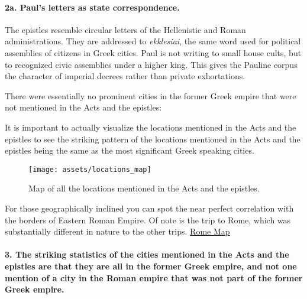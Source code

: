 \paragraph{2a.
Paul’s letters as state correspondence.}\label{par:pauls-letters-as-state-correspondence.}

The epistles resemble circular letters of the Hellenistic and Roman administrations.
They are addressed to \textit{ekklesiai}, the same word used for political assemblies of citizens in Greek cities.
Paul is not writing to small house cults, but to recognized civic assemblies under a higher king.
This gives the Pauline corpus the character of imperial decrees rather than private exhortations.

There were essentially no prominent cities in the former Greek empire that were not mentioned in the Acts and the epistles:


It is important to actually visualize the locations mentioned in the Acts and the epistles to see the striking pattern of the locations mentioned in the Acts and the epistles being the same as the most significant Greek speaking cities.

\begin{figure}[ht]
    \centering
    \texttt{[image: assets/locations\_map]}
    \caption{Map of all the locations mentioned in the Acts and the epistles.}
    \label{fig:figure}
\end{figure}

For those geographically inclined you can spot the near perfect correlation with the borders of Eastern Roman Empire.
Of note is the trip to Rome, which was substantially different in nature to the other trips.
\href{https://en.wikipedia.org/wiki/Byzantine_Empire_under_the_Theodosian_dynasty\#/media/File:4KTHEODOSIAN.png}{Rome Map}

\paragraph{3.
The striking statistics of the cities mentioned in the Acts and the epistles are that they are all in the former Greek empire, and not one mention of a city in the Roman empire that was not part of the former Greek empire.}\label{par:the-striking-statistics-of-the-cities-mentioned-in-the-acts-and-the-epistles-are-that-they-are-all-in-the-former-greek-empire-and-not-one-mention-of-a-city-in-the-roman-empire-that-was-not-part-of-the-former-greek-empire.}

